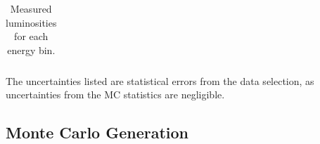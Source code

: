 \begin{table}[H]
\begin{tabular}{r l c l}
\hline
\end{tabular}
\caption{Measured luminosities for each energy bin.}{The uncertainties listed are statistical errors from the data selection, as uncertainties from the MC statistics are negligible.}
\label{tab:luminosity}
\end{table}


\subsection{Monte Carlo Generation}
\label{ssec:monte_carlo}

